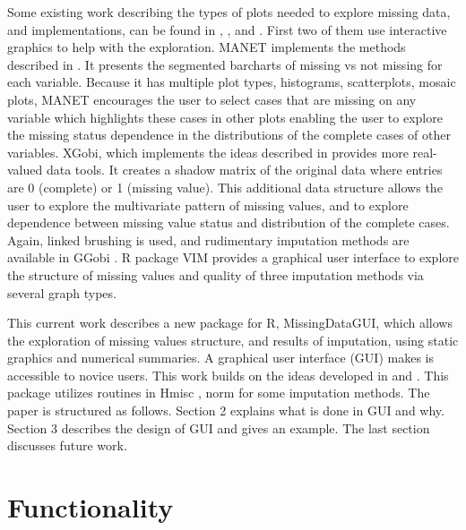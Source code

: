 \documentclass[english]{article}
\newcommand{\pkg}[1]{{\fontseries{b}\selectfont #1}}
\begin{document}
Some existing work describing the types of plots needed to explore missing data, and implementations, can be found in \citet{unwin1996interactive}, \citet{swayne1998missing}, and \citet{templ2008visualization}. First two of them use interactive graphics to help with the exploration.  MANET implements the methods described in \citet{unwin1996interactive}. It presents the segmented barcharts of missing vs not missing for each variable. Because it has multiple plot types, histograms, scatterplots, mosaic plots, MANET encourages the user to select cases that are missing on any variable which highlights these cases in other plots enabling the user to explore the missing status dependence in the distributions of the complete cases of other variables.  XGobi, which implements the ideas described in \citet{swayne1998missing} provides more real-valued data tools. It creates a shadow matrix of the original data where entries are 0 (complete) or 1 (missing value). This additional data structure allows the user to explore the multivariate pattern of missing values, and to explore dependence between missing value status and distribution of the complete cases. Again, linked brushing is used, and rudimentary imputation methods are available in GGobi \citep{STLBC03}. R package \pkg{VIM} \citep{VIM} provides a graphical user interface to explore the structure of missing values and quality of three imputation methods via several graph types.

This current work describes a new package for R, \pkg{MissingDataGUI}, which allows the exploration of missing values structure, and results of imputation, using static graphics and numerical summaries. A graphical user interface (GUI) makes is accessible to novice users. This work builds on the ideas developed in \citet{unwin1996interactive} and \citet{swayne1998missing}. This package utilizes routines in \pkg{Hmisc} \citep{hmisc}, \pkg{norm} \citep{norm} for some imputation methods. The paper is structured as follows. Section 2 explains what is done in GUI and why. Section 3 describes the design of GUI and gives an example. The last section discusses future work.

\section{Functionality}
\end{document}
